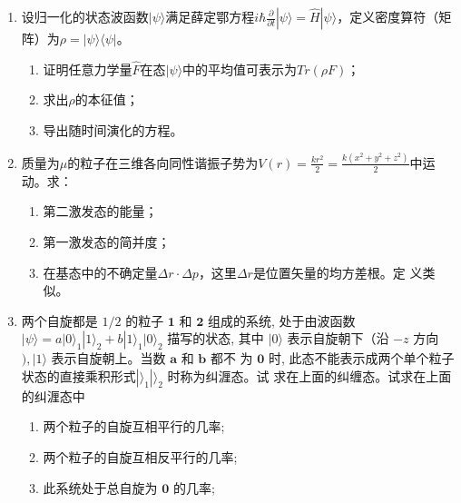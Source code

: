 \begin{enumerate}
\banswer{
	
}



\item 
设归一化的状态波函数$|\psi\rangle$满足薛定鄂方程$i\hbar\frac{\partial}{\partial t}|\psi\rangle=\hat{H}|\psi\rangle$，定义密度算符（矩阵）为$\rho=|\psi\rangle\langle\psi|$。
\begin{enumerate}
	\item
证明任意力学量$\hat{F}$在态$|\psi\rangle$中的平均值可表示为$Tr(\rho F)$；

\item 
求出$\rho$的本征值；

\item 
导出随时间演化的方程。
\end{enumerate}

\banswer{
	
}


\newpage
\item 
质量为$\mu$的粒子在三维各向同性谐振子势为$V(r)=\frac{kr^2}{2}=\frac{k(x^2+y^2+z^2)}{2}$中运动。求：
\begin{enumerate}
	\item
第二激发态的能量；
\item 
第一激发态的简并度；
\item 
在基态中的不确定量$\Delta r\cdot\Delta p$，这里$\Delta r$是位置矢量的均方差根。定
义类似。
\end{enumerate}


\banswer{
	
}


\item 
两个自旋都是 $1 / 2$ 的粒子 $\mathbf{1}$ 和 $\mathbf{2}$ 组成的系统, 处于由波函数 $|\psi\rangle=a|0\rangle_{1}|1\rangle_{2}+b|1\rangle_{1}|0\rangle_{2}$ 描写的状态, 其中 $|0\rangle$ 表示自旋朝下（沿 $-z$ 方向 $),|1\rangle$ 表示自旋朝上。当数 $\mathbf{a}$ 和 $\mathbf{b}$ 都不 为 $\mathbf{0}$ 时, 此态不能表示成两个单个粒子状态的直接乘积形式$ |\rangle_{1}|\rangle_{2}$ 时称为纠湹态。试 求在上面的纠缠态。试求在上面的纠湹态中
\begin{enumerate}
	\item
两个粒子的自旋互相平行的几率;
\item
两个粒子的自旋互相反平行的几率;
\item
此系统处于总自旋为 $\mathbf{0}$ 的几率;	
	

\end{enumerate}
\end{enumerate}
